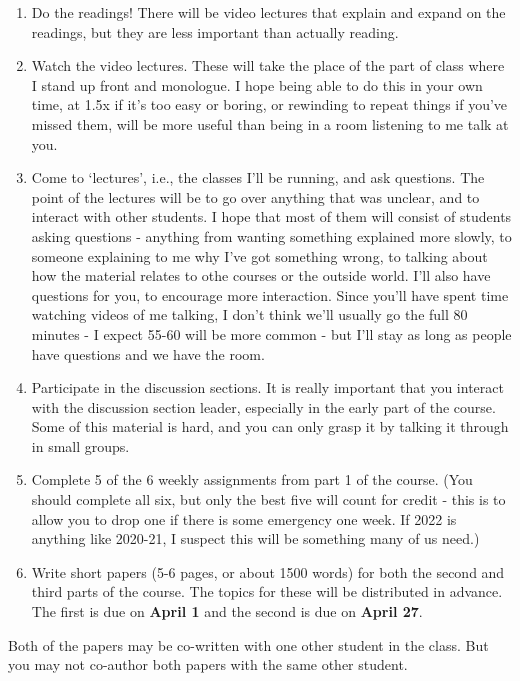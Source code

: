 \documentclass[
]{article}
\providecommand{\tightlist}{%
  \setlength{\itemsep}{0pt}\setlength{\parskip}{0pt}}
\begin{document}
\begin{enumerate}
\def\labelenumi{\arabic{enumi}.}
\tightlist
\item
  Do the readings! There will be video lectures that explain and expand
  on the readings, but they are less important than actually reading.
\item
  Watch the video lectures. These will take the place of the part of
  class where I stand up front and monologue. I hope being able to do
  this in your own time, at 1.5x if it's too easy or boring, or
  rewinding to repeat things if you've missed them, will be more useful
  than being in a room listening to me talk at you.
\item
  Come to `lectures', i.e., the classes I'll be running, and ask
  questions. The point of the lectures will be to go over anything that
  was unclear, and to interact with other students. I hope that most of
  them will consist of students asking questions - anything from wanting
  something explained more slowly, to someone explaining to me why I've
  got something wrong, to talking about how the material relates to othe
  courses or the outside world. I'll also have questions for you, to
  encourage more interaction. Since you'll have spent time watching
  videos of me talking, I don't think we'll usually go the full 80
  minutes - I expect 55-60 will be more common - but I'll stay as long
  as people have questions and we have the room.
\item
  Participate in the discussion sections. It is really important that
  you interact with the discussion section leader, especially in the
  early part of the course. Some of this material is hard, and you can
  only grasp it by talking it through in small groups.
\item
  Complete 5 of the 6 weekly assignments from part 1 of the course. (You
  should complete all six, but only the best five will count for credit
  - this is to allow you to drop one if there is some emergency one
  week. If 2022 is anything like 2020-21, I suspect this will be
  something many of us need.)
\item
  Write short papers (5-6 pages, or about 1500 words) for both the
  second and third parts of the course. The topics for these will be
  distributed in advance. The first is due on \textbf{April 1} and the
  second is due on \textbf{April 27}.
\end{enumerate}

Both of the papers may be co-written with one other student in the
class. But you may not co-author both papers with the same other
student.
\end{document}

